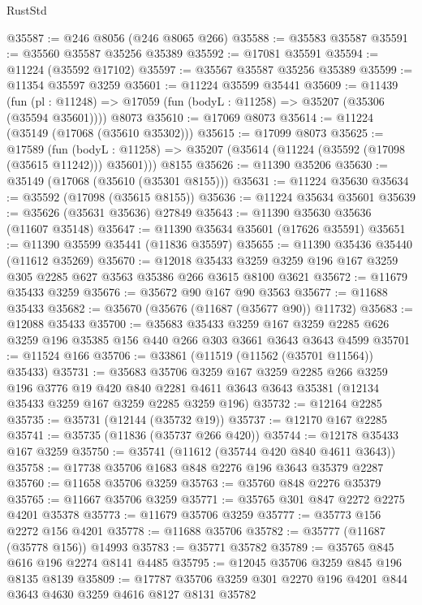 \begin{lexlean}{RustStd}
\begin{coremodule}
@35587 := @246 @8056 (@246 @8065 @266)
@35588 := @35583 @35587
@35591 := @35560 @35587 @35256 @35389
@35592 := @17081 @35591
@35594 := @11224 (@35592 @17102)
@35597 := @35567 @35587 @35256 @35389
@35599 := @11354 @35597 @3259
@35601 := @11224 @35599 @35441
@35609 := @11439
    (fun (pl : @11248) => @17059 (fun (bodyL : @11258) => @35207 (@35306 (@35594 @35601))))
    @8073
@35610 := @17069 @8073
@35614 := @11224 (@35149 (@17068 (@35610 @35302)))
@35615 := @17099 @8073
@35625 := @17589
    (fun (bodyL : @11258) => @35207 (@35614 (@11224 (@35592 (@17098 (@35615 @11242))) @35601)))
    @8155
@35626 := @11390 @35206
@35630 := @35149 (@17068 (@35610 (@35301 @8155)))
@35631 := @11224 @35630
@35634 := @35592 (@17098 (@35615 @8155))
@35636 := @11224 @35634 @35601
@35639 := @35626 (@35631 @35636) @27849
@35643 := @11390 @35630 @35636 (@11607 @35148)
@35647 := @11390 @35634 @35601 (@17626 @35591)
@35651 := @11390 @35599 @35441 (@11836 @35597)
@35655 := @11390 @35436 @35440 (@11612 @35269)
@35670 := @12018
    @35433
    @3259
    @3259
    @196
    @167
    @3259
    @305
    @2285
    @627
    @3563
    @35386
    @266
    @3615
    @8100
    @3621
@35672 := @11679 @35433 @3259
@35676 := @35672 @90 @167 @90 @3563
@35677 := @11688 @35433
@35682 := @35670 (@35676 (@11687 (@35677 @90)) @11732)
@35683 := @12088 @35433
@35700 := @35683
    @35433
    @3259
    @167
    @3259
    @2285
    @626
    @3259
    @196
    @35385
    @156
    @440
    @266
    @303
    @3661
    @3643
    @3643
    @4599
@35701 := @11524 @166
@35706 := @33861 (@11519 (@11562 (@35701 @11564)) @35433)
@35731 := @35683
    @35706
    @3259
    @167
    @3259
    @2285
    @266
    @3259
    @196
    @3776
    @19
    @420
    @840
    @2281
    @4611
    @3643
    @3643
    @35381
    (@12134 @35433 @3259 @167 @3259 @2285 @3259 @196)
@35732 := @12164 @2285
@35735 := @35731 (@12144 (@35732 @19))
@35737 := @12170 @167 @2285
@35741 := @35735 (@11836 (@35737 @266 @420))
@35744 := @12178 @35433 @167 @3259
@35750 := @35741 (@11612 (@35744 @420 @840 @4611 @3643))
@35758 := @17738 @35706 @1683 @848 @2276 @196 @3643 @35379 @2287
@35760 := @11658 @35706 @3259
@35763 := @35760 @848 @2276 @35379
@35765 := @11667 @35706 @3259
@35771 := @35765 @301 @847 @2272 @2275 @4201 @35378
@35773 := @11679 @35706 @3259
@35777 := @35773 @156 @2272 @156 @4201
@35778 := @11688 @35706
@35782 := @35777 (@11687 (@35778 @156)) @14993
@35783 := @35771 @35782
@35789 := @35765 @845 @616 @196 @2274 @8141 @4485
@35795 := @12045 @35706 @3259 @845 @196 @8135 @8139
@35809 := @17787 @35706 @3259 @301 @2270 @196 @4201 @844 @3643 @4630 @3259 @4616 @8127 @8131 @35782

\end{coremodule}
\end{lexlean}
